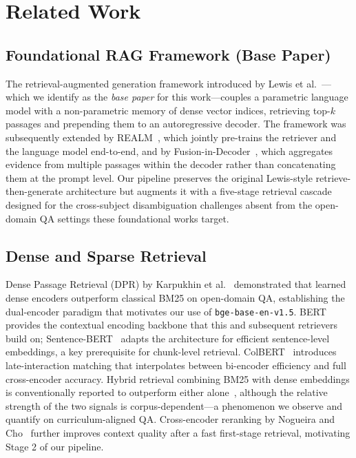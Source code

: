 \documentclass[conference]{IEEEtran}
\begin{document}
\section{Related Work}

\subsection{Foundational RAG Framework (Base Paper)}
The retrieval-augmented generation framework introduced by Lewis et al.~\cite{lewis2020rag}---which we identify as the \emph{base paper} for this work---couples a parametric language model with a non-parametric memory of dense vector indices, retrieving top-$k$ passages and prepending them to an autoregressive decoder. The framework was subsequently extended by REALM~\cite{guu2020realm}, which jointly pre-trains the retriever and the language model end-to-end, and by Fusion-in-Decoder~\cite{izacard2021fid}, which aggregates evidence from multiple passages within the decoder rather than concatenating them at the prompt level. Our pipeline preserves the original Lewis-style retrieve-then-generate architecture but augments it with a five-stage retrieval cascade designed for the cross-subject disambiguation challenges absent from the open-domain QA settings these foundational works target.

\subsection{Dense and Sparse Retrieval}
Dense Passage Retrieval (DPR) by Karpukhin et al.~\cite{karpukhin2020dpr} demonstrated that learned dense encoders outperform classical BM25 on open-domain QA, establishing the dual-encoder paradigm that motivates our use of \texttt{bge-base-en-v1.5}. BERT~\cite{devlin2019bert} provides the contextual encoding backbone that this and subsequent retrievers build on; Sentence-BERT~\cite{reimers2019sbert} adapts the architecture for efficient sentence-level embeddings, a key prerequisite for chunk-level retrieval. ColBERT~\cite{khattab2020colbert} introduces late-interaction matching that interpolates between bi-encoder efficiency and full cross-encoder accuracy. Hybrid retrieval combining BM25 with dense embeddings is conventionally reported to outperform either alone~\cite{lin2021sparse}, although the relative strength of the two signals is corpus-dependent---a phenomenon we observe and quantify on curriculum-aligned QA. Cross-encoder reranking by Nogueira and Cho~\cite{nogueira2019bert} further improves context quality after a fast first-stage retrieval, motivating Stage 2 of our pipeline.
\end{document}
